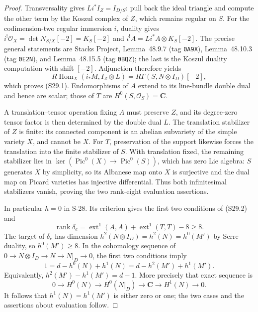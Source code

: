 \begin{proof}
Transversality gives
$Li^*I_Z=I_{D/S}$: pull back the ideal triangle and
compute the other term by the Koszul complex of $Z$,
which remains regular on $S$.
For the codimension-two regular immersion $i$, duality
gives $i^!\mathcal O_X=\det N_{S/X}[-2]=K_S[-2]$ and
$i^!A=Li^*A\otimes K_S[-2]$.
The precise general statements are Stacks Project,
Lemma~48.9.7 (tag \texttt{0A9X}),
Lemma~48.10.3 (tag \texttt{0E2N}), and
Lemma~48.15.5 (tag \texttt{0BQZ}); the last is the
Koszul duality computation with shift $[-2]$.
Adjunction therefore yields
\[
 R\operatorname{Hom}_X(i_*M,I_Z\otimes L)
     =R\Gamma(S,N\otimes I_D)[-2],
 \tag{S29.4}
\]
which proves (S29.1).
Endomorphisms of $A$ extend to its line-bundle double
dual and hence are scalar; those of $T$ are
$H^0(S,\mathcal O_S)=\mathbf C$.

A translation--tensor operation fixing $A$ must preserve
$Z$, and its degree-zero tensor factor is then determined
by the double dual $L$. The translation stabilizer of
$Z$ is finite: its connected component is an abelian
subvariety of the simple variety $X$, and cannot be $X$.
For $T$, preservation of the support likewise forces the
translation into the finite stabilizer of $S$. With
translation fixed, the remaining stabilizer lies in
$\ker(\operatorname{Pic}^0(X)\to\operatorname{Pic}^0(S))$,
which has zero Lie algebra: $S$ generates $X$ by simplicity,
so its Albanese map onto $X$ is surjective and the dual
map on Picard varieties has injective differential.
Thus both infinitesimal stabilizers vanish, proving the
two rank-eight evaluation assertions.

In particular $h=0$ in S-28. Its criterion gives the
first two conditions of (S29.2) and
\[
 \operatorname{rank}\delta_e
   =\operatorname{ext}^1(A,A)+\operatorname{ext}^1(T,T)-8
   \ge8.
\]
The target of $\delta_e$ has dimension
$h^2(N\otimes I_D)=h^2(N)=h^0(M')$ by Serre duality,
so $h^0(M')\ge8$.
In the cohomology sequence of
$0\to N\otimes I_D\to N\to N|_D\to0$, the first two
conditions imply
\[
 1=d-h^0(N)+h^1(N)
   =d-h^2(M')+h^1(M').
\]
Equivalently, $h^2(M')-h^1(M')=d-1$.
More precisely that exact sequence is
\[
 0\longrightarrow H^0(N)\longrightarrow H^0(N|_D)
 \longrightarrow \mathbf C\longrightarrow H^1(N)
 \longrightarrow0.
 \tag{S29.5}
\]
It follows that $h^1(N)=h^1(M')$ is either zero or one;
the two cases and the assertions about evaluation follow.


\end{proof}
